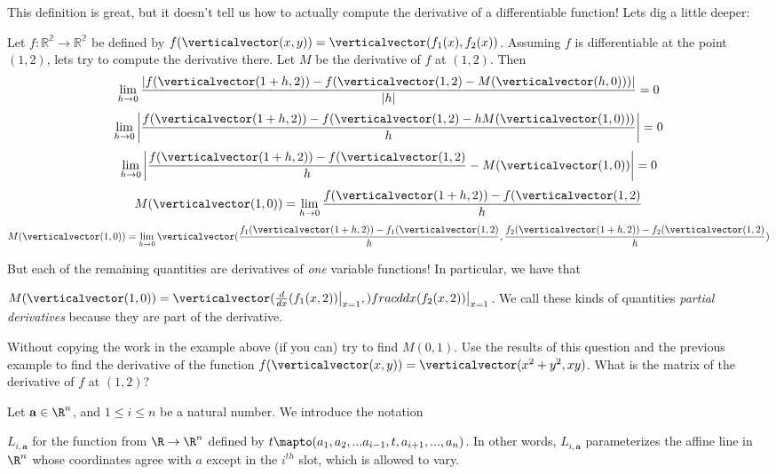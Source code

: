 This definition is great, but it doesn't tell us how to actually compute the derivative of a differentiable function!  Lets dig a little deeper:

\begin{example}
	Let $f:\mathbb{R^2} \to \mathbb{R^2}$ be defined by $f(\verticalvector(x,y)) = \verticalvector(f_1(x),f_2(x))$. 
	 Assuming $f$ is differentiable at the point $(1,2)$, lets try to compute the derivative there. 
	 Let $M$ be the derivative of $f$ at $(1,2)$.  Then 
	 \[\lim_{h \to 0} \frac{\left|f(\verticalvector(1+h,2)) - f(\verticalvector(1,2) - M(\verticalvector(h,0)))\right|}{\left|h\right|} = 0\]
	 \[ \lim_{h \to 0}\left| \frac{f(\verticalvector(1+h,2)) - f(\verticalvector(1,2) - hM(\verticalvector(1,0)))}{h} \right| = 0\]
	 \[ \lim_{h \to 0}\left| \frac{f(\verticalvector(1+h,2)) - f(\verticalvector(1,2)}{h} -M(\verticalvector(1,0))\right| = 0\]
	 \[ M(\verticalvector(1,0)) = \lim_{ h \to 0 } \frac{f(\verticalvector(1+h,2)) - f(\verticalvector(1,2)}{h}\]
	 \[ M(\verticalvector(1,0)) = \lim_{ h \to 0 } \verticalvector(\frac{f_1(\verticalvector(1+h,2)) - f_1(\verticalvector(1,2)}{h}, \frac{f_2(\verticalvector(1+h,2)) - f_2(\verticalvector(1,2)}{h})\]
	 
	 But each of the remaining quantities are derivatives of \textit{one} variable functions!  In particular, we have that
	 
	 $M(\verticalvector(1,0)) = \verticalvector(\frac{d}{dx}(f_1(x,2))\big|_{x=1},)frac{d}{dx}(f_2(x,2))\big|_{x=1}$.  
	 We call these kinds of quantities \textit{partial derivatives}  because they are part of the derivative.
\end{example}

\begin{question}
	Without copying the work in the example above (if you can) try to find $M(0,1)$.
	Use the results of this question and the previous example to find the derivative of the function $f(\verticalvector(x,y)) = \verticalvector(x^2+y^2,xy)$.
	What is the matrix of the derivative of $f$ at $(1,2)$?
\end{question}

\begin{definition}
	Let $\mathbf{a} \in \R^n$, and $1\leq i \leq n$ be a natural number.  We introduce the notation
	
	$L_{i,\mathbf{a}}$ for the function from $\R \to \R^n$ defined by $t \mapto (a_1,a_2,...a_{i-1},t,a_{i+1},...,a_n)$.  In other words, $L_{i,\mathbf{a}}$ parameterizes the
	affine line in $\R^n$ whose coordinates agree with $a$ except in the $i^{th}$ slot, which is allowed to vary.
\end{definition}

